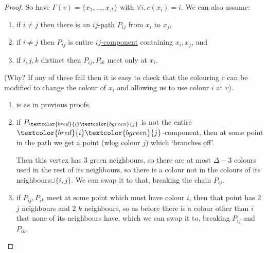 \documentclass{article}
\newcommand{\red}[1]{\textcolor{bred}{#1}}
\newcommand{\green}[1]{\textcolor{bgreen}{#1}}
\begin{document}
\begin{proof}
    So have $\Gamma(v) = \{x_1, \dotsc, x_\Delta\}$ with $\forall i, c(x_i) = i$.
    We can also assume:
    \begin{enumerate}[label=(\roman*)]
        \item if $i \neq j$ then there is an \hyperlink{def:ijpath}{$ij$-path} $P_{ij}$ from $x_i$ to $x_j$,
        \item if $i \neq j$ then $P_{ij}$ is entire \hyperlink{def:ijcomp}{$ij$-component} containing $x_i,x_j$, and
        \item if $i, j, k$ distinct then $P_{ij}, P_{ik}$ meet only at $x_i$.
    \end{enumerate}
    (Why? If any of these fail then it is easy to check that the colouring $c$ can be modified to change the colour of $x_i$ and allowing us to use colour $i$ at $v$).
    \begin{enumerate}[label=(\roman*)]
        \item is as in previous proofs.
        \item if $P_{\red{i}\green{j}}$ is not the entire $\red{i}\green{j}$-component, then
            at some point in the path we get a point (wlog colour \green{$j$}) which `branches off'.
            \begin{center}
            \end{center}
            Then this vertex has 3 \green{green} neighbours, so there are at most $\Delta - 3$ colours used in the rest of its neighbours, so there is a colour not in the colours of its neighbours$\cup \{i,j\}$.
            We can swap it to that, breaking the chain $P_{ij}$.
        \item if $P_{ij}, P_{ik}$ meet at some point which must have colour $i$, then that point has 2 $j$ neighbours and 2 $k$ neighbours, so as before there is a colour other than $i$ that none of its neighbours have, which we can swap it to, breaking $P_{ij}$ and $P_{ik}$.
    \end{enumerate}


\end{proof}
\end{document}
